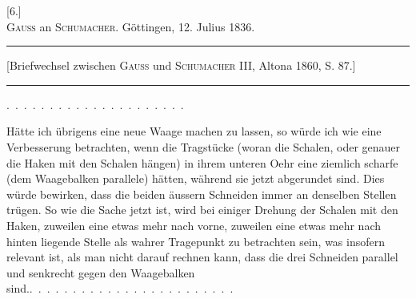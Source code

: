 \clearpage\begingroup{}
\begin{center}
[6.]\\[.7em]
\textsc{Gauss} an \textsc{Schumacher}. Göttingen, 12. Julius 1836.
\par\medskip\rule{.78\textwidth}{.35pt}\par
{\small [Briefwechsel zwischen \textsc{Gauss} und \textsc{Schumacher} III, Altona 1860, S. 87.]}\par
\rule{.78\textwidth}{.35pt}
\end{center}
\noindent .\ .\ .\ .\ .\ .\ .\ .\ .\ .\ .\ .\ .\ .\ .\ .\ .\ .\ .\ .\ .
\par\noindent\hspace*{\parindent}Hätte ich übrigens eine neue Waage machen zu lassen, so würde ich
wie eine Verbesserung betrachten, wenn die Tragstücke (woran die Schalen,
oder genauer die Haken mit den Schalen hängen) in ihrem unteren Oehr
eine ziemlich scharfe (dem Waagebalken parallele)  hätten, während
sie jetzt abgerundet sind. Dies würde bewirken, dass die beiden äussern
Schneiden immer an denselben Stellen trügen. So wie die Sache jetzt ist,
wird bei einiger Drehung der Schalen mit den Haken, zuweilen eine etwas
mehr nach vorne, zuweilen eine etwas mehr nach hinten liegende Stelle als
wahrer Tragepunkt zu betrachten sein, was insofern relevant ist, als man
nicht darauf rechnen kann, dass die drei Schneiden  parallel und senkrecht
gegen den Waagebalken sind.\quad .\ .\ .\ .\ .\ .\ .\ .\ .\ .\ .\ .\ .\ .\ .\ .\ .\ .\ .\ .\ .\ .\ .\ .
\clearpage\endgroup
